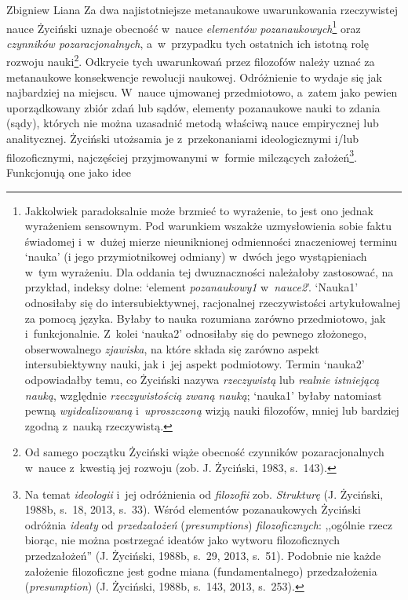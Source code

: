 \begin{artplenv}{Zbigniew Liana}
Za dwa najistotniejsze metanaukowe uwarunkowania rzeczywistej nauce Życiński uznaje obecność w~nauce \textit{elementów
pozanaukowych}\footnote{Jakkolwiek paradoksalnie może brzmieć to wyrażenie, to jest ono jednak wyrażeniem sensownym.
Pod warunkiem wszakże uzmysłowienia sobie faktu świadomej i~w~dużej mierze nieuniknionej odmienności znaczeniowej
terminu `nauka' (i jego przymiotnikowej odmiany) w~dwóch jego wystąpieniach w~tym wyrażeniu. Dla oddania tej
dwuznaczności należałoby zastosować, na przykład, indeksy dolne: `element \textit{pozanaukowy1} w~\textit{nauce2}'.
`Nauka1' odnosiłaby się do intersubiektywnej, racjonalnej rzeczywistości artykułowalnej za pomocą języka. Byłaby to
nauka rozumiana zarówno przedmiotowo, jak i~funkcjonalnie. Z~kolei `nauka2' odnosiłaby się do pewnego złożonego,
obserwowalnego \textit{zjawiska}, na które składa się zarówno aspekt intersubiektywny nauki, jak i~jej aspekt podmiotowy.
Termin `nauka2' odpowiadałby temu, co Życiński nazywa \textit{rzeczywistą }lub\textit{ realnie istniejącą nauką}, względnie
\textit{rzeczywistością zwaną nauką}; `nauka1' byłaby natomiast pewną \textit{wyidealizowaną} i~\textit{uproszczoną }wizją
nauki filozofów, mniej lub bardziej zgodną z~nauką rzeczywistą.} oraz
\textit{czynników pozaracjonalnych}, a~w~przypadku
tych ostatnich ich istotną rolę rozwoju nauki\footnote{Od samego początku Życiński wiąże obecność czynników
pozaracjonalnych w~nauce z~kwestią jej rozwoju \label{ref:RNDGwyI8mc6od}(zob. J. Życiński, 1983, s.~143).}. Odkrycie
tych uwarunkowań przez filozofów należy uznać za metanaukowe konsekwencje rewolucji naukowej. Odróżnienie to wydaje się
jak najbardziej na miejscu. W~nauce ujmowanej przedmiotowo, a~zatem jako pewien uporządkowany zbiór zdań lub sądów,
elementy pozanaukowe nauki to zdania (sądy), których nie można uzasadnić metodą właściwą nauce empirycznej lub
analitycznej. Życiński utożsamia je z~przekonaniami ideologicznymi i/lub filozoficznymi, najczęściej przyjmowanymi w~formie
milczących założeń\footnote{Na temat \textit{ideologii} i~jej odróżnienia od \textit{filozofii} zob.
\textit{Strukturę} \label{ref:RND65JRx0WUvQ}(J. Życiński, 1988b, s.~18, 2013, s.~33). Wśród elementów pozanaukowych
Życiński odróżnia \textit{ideaty} od \textit{przedzałożeń} (\textit{presumptions}) \textit{filozoficznych}: ,,ogólnie rzecz
biorąc, nie można postrzegać ideatów jako wytworu filozoficznych przedzałożeń'' \label{ref:RNDNBJ2x09ZUn}(J. Życiński,
1988b, s.~29, 2013, s.~51). Podobnie nie każde założenie filozoficzne jest godne miana (fundamentalnego) przedzałożenia
(\textit{presumption}) \label{ref:RNDKgGZVRdQ4Q}(J. Życiński, 1988b, s.~143, 2013, s.~253).}. Funkcjonują one jako idee

\end{artplenv}
